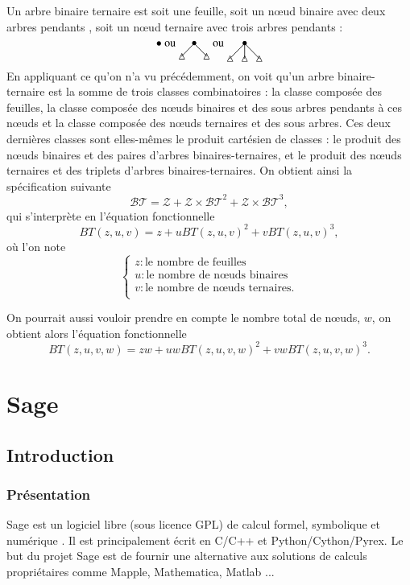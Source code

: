 \documentclass[12pt]{report}
\begin{document}
Un arbre binaire ternaire est soit une feuille, 
soit un nœud binaire avec deux arbres pendants ,
soit un nœud ternaire avec trois arbres pendants :
$$\bullet\text{ ou } 
\xymatrix@R=5pt @C=5pt{& *={\bullet} \ar@{-}[dl]\ar@{-}[dr]& \\ *={\triangle}&&*={\triangle}} \text{ ou }
\xymatrix@R=10pt @C=10pt{& *={\bullet} \ar@{-}[dl]\ar@{-}[dr]\ar@{-}[d]& \\ *={\triangle}&*={\triangle}&*={\triangle} }$$
En appliquant ce qu'on n'a vu précédemment, on voit qu'un arbre binaire-ternaire est la somme de trois classes combinatoires : la classe composée des feuilles, la classe composée des nœuds binaires et des sous arbres pendants à ces nœuds et la classe composée des nœuds ternaires et des sous arbres. Ces deux dernières classes sont elles-mêmes le produit cartésien de classes : le produit des nœuds binaires et des paires d'arbres binaires-ternaires, et le produit des nœuds ternaires et des triplets d'arbres binaires-ternaires.
On obtient ainsi la spécification suivante
$$\mathcal{BT} = \mathcal Z + \mathcal Z\times\mathcal{BT}^2 + \mathcal Z\times\mathcal{BT}^3, $$
qui s'interprète en l'équation fonctionnelle
$$BT(z,u,v) = z+uBT(z,u,v)^2+vBT(z,u,v)^3,$$
où l'on note 
$$\left\{
\begin{array}{l}
  z : \text{le nombre de feuilles}\\
  u : \text{le nombre de nœuds binaires}\\
  v : \text{le nombre de nœuds ternaires.}\\
\end{array}\right.
$$

On pourrait aussi vouloir prendre en compte le nombre total de nœuds, $w$, on obtient alors l'équation fonctionnelle
$$BT(z,u,v,w) = zw+uwBT(z,u,v,w)^2+vwBT(z,u,v,w)^3.$$

\chapter{Sage}

\section{Introduction}

\subsection{Présentation}
Sage est un logiciel libre (sous licence GPL) de calcul formel, symbolique et
numérique \cite{sage}. Il est principalement écrit en C/C++ et Python/Cython/Pyrex. Le but
du projet Sage est de fournir une alternative aux solutions de calculs
propriétaires comme Mapple, Mathematica, Matlab ...
\end{document}
